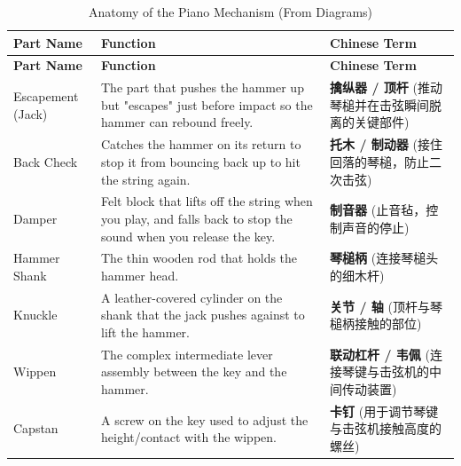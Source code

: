 \documentclass[math,code]{amznotes}
\theoremstyle{remark}
\begin{document}
\begin{longtable}{p{} p{} p{}}
\caption{Anatomy of the Piano Mechanism (From Diagrams)} \\
\toprule
\textbf{Part Name} & \textbf{Function} & \textbf{Chinese Term} \\
\midrule
\endfirsthead

\toprule
\textbf{Part Name} & \textbf{Function} & \textbf{Chinese Term} \\
\midrule
\endhead

\bottomrule
\endfoot

Escapement (Jack) & The part that pushes the hammer up but "escapes" just before impact so the hammer can rebound freely. & \textbf{擒纵器 / 顶杆} (推动琴槌并在击弦瞬间脱离的关键部件) \\
\midrule
Back Check & Catches the hammer on its return to stop it from bouncing back up to hit the string again. & \textbf{托木 / 制动器} (接住回落的琴槌，防止二次击弦) \\
\midrule
Damper & Felt block that lifts off the string when you play, and falls back to stop the sound when you release the key. & \textbf{制音器} (止音毡，控制声音的停止) \\
\midrule
Hammer Shank & The thin wooden rod that holds the hammer head. & \textbf{琴槌柄} (连接琴槌头的细木杆) \\
\midrule
Knuckle & A leather-covered cylinder on the shank that the jack pushes against to lift the hammer. & \textbf{关节 / 轴} (顶杆与琴槌柄接触的部位) \\
\midrule
Wippen & The complex intermediate lever assembly between the key and the hammer. & \textbf{联动杠杆 / 韦佩} (连接琴键与击弦机的中间传动装置) \\
\midrule
Capstan & A screw on the key used to adjust the height/contact with the wippen. & \textbf{卡钉} (用于调节琴键与击弦机接触高度的螺丝) \\
\end{longtable}
\end{document}
